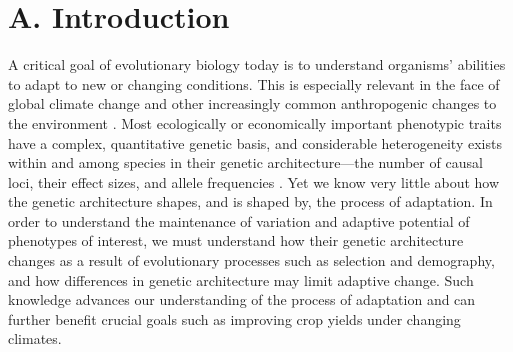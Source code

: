 




\vspace{-0.6cm}
\section*{A. Introduction} \vspace{-1ex} %

A critical goal of evolutionary biology today is to understand organisms' abilities to adapt to new or changing conditions. This is especially relevant in the face of global climate change and other increasingly common anthropogenic changes to the environment \citep{Easterling:2000ja}. Most ecologically or economically important phenotypic traits have a complex, quantitative genetic basis, and considerable heterogeneity exists within and among species in their genetic architecture---the number of causal loci, their effect sizes, and allele frequencies \citep{orr:2001, slate:2005}. Yet we know very little about how the genetic architecture shapes, and is shaped by, the process of adaptation. In order to understand the maintenance of variation and adaptive potential of phenotypes of interest, we must understand how their genetic architecture changes as a result of evolutionary processes such as selection and demography, and how differences in genetic architecture may limit adaptive change. Such knowledge advances our understanding of the process of adaptation and can further benefit crucial goals such as improving crop yields under changing climates. 

